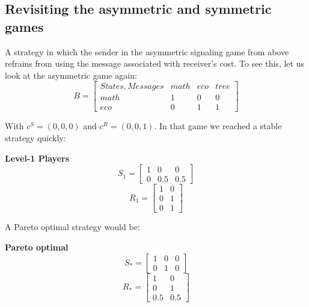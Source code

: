 \documentclass{article}
\begin{document}
\subsection{Revisiting the asymmetric and symmetric games}
A strategy in which the sender in the asymmetric signaling game from above refrains from using the message associated with receiver's cost. To see this, let us look at the asymmetric game again:
 \begin{equation*}
 B =
 \begin{bmatrix}

 States, Messages & math & eco & tree \\
 math             & 1    & 0   & 0    \\
 eco              & 0    & 1   & 1
 \end{bmatrix}
 \end{equation*}

 With $c^S=(0,0,0)$ and $c^R=(0,0,1)$. In that game we reached a stable strategy quickly:

\textbf{Level-1 Players}\\
\begin{equation*}
S_1=
\begin{bmatrix}
1 & 0 & 0\\
0 & 0.5 & 0.5
\end{bmatrix}
\end{equation*}
\begin{equation*}
R_1=
\begin{bmatrix}
1 & 0\\
0 & 1\\
0 & 1
\end{bmatrix}
\end{equation*}

A Pareto optimal strategy would be:

\textbf{Pareto optimal}\\
\begin{equation*}
S_*=
\begin{bmatrix}
1 & 0 & 0\\
0 & 1 & 0
\end{bmatrix}
\end{equation*}
\begin{equation*}
R_*=
\begin{bmatrix}
1 & 0\\
0 & 1\\
0.5 & 0.5
\end{bmatrix}
\end{equation*}
\end{document}

